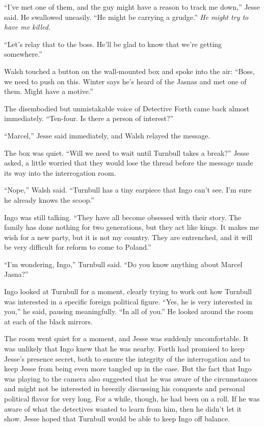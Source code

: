 \documentclass[12pt]{book}
\begin{document}
``I've met one of them, and the guy might have a reason to track me down,'' Jesse said.  He swallowed uneasily.  ``He might be carrying a grudge.''  \emph{He might try to have me killed.}

``Let's relay that to the boss.  He'll be glad to know that we're getting somewhere.''  

Walsh touched a button on the wall-mounted box and spoke into the air: ``Boss, we need to push on this.  Winter says he's heard of the Jasnas and met one of them.  Might have a motive.''

The disembodied but unmistakable voice of Detective Forth came back almost immediately.  ``Ten-four.  Is there a person of interest?''

``Marcel,'' Jesse said immediately, and Walsh relayed the message.

The box was quiet.  ``Will we need to wait until Turnbull takes a break?'' Jesse asked, a little worried that they would lose the thread before the message made its way into the interrogation room.

``Nope,'' Walsh said.  ``Turnbull has a tiny earpiece that Ingo can't see.  I'm sure he already knows the scoop.''

Ingo was still talking.  ``They have all become obsessed with their story.  The family has done nothing for two generations, but they act like kings.  It makes me wish for a new party, but it is not my country.  They are entrenched, and it will be very difficult for reform to come to Poland.''

``I'm wondering, Ingo,'' Turnbull said.  ``Do you know anything about Marcel Jasna?''

Ingo looked at Turnbull for a moment, clearly trying to work out how Turnbull was interested in a specific foreign political figure.  ``Yes, he is very interested in you,'' he said, pausing meaningfully.  ``In all of you.''  He looked around the room at each of the black mirrors.

The room went quiet for a moment, and Jesse was suddenly uncomfortable.  It was unlikely that Ingo knew that he was nearby.  Forth had promised to keep Jesse's presence secret, both to ensure the integrity of the interrogation and to keep Jesse from being even more tangled up in the case.  But the fact that Ingo was playing to the camera also suggested that he was aware of the circumstances and might not be interested in breezily discussing his conquests and personal political flavor for very long.  For a while, though, he had been on a roll.  If he was aware of what the detectives wanted to learn from him, then he didn't let it show.  Jesse hoped that Turnbull would be able to keep Ingo off balance.
\end{document}
